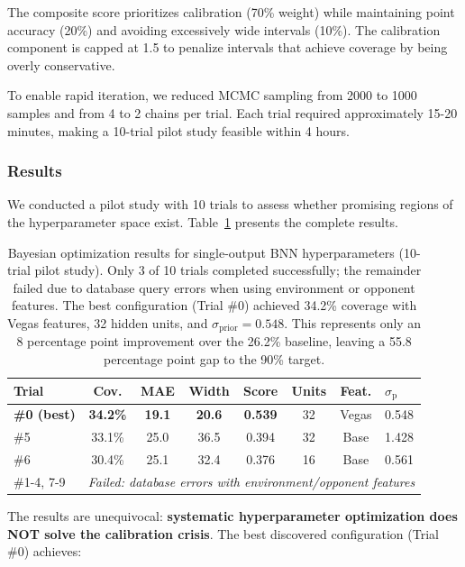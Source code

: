 The composite score prioritizes calibration (70\% weight) while maintaining point accuracy (20\%) and avoiding excessively wide intervals (10\%). The calibration component is capped at 1.5 to penalize intervals that achieve coverage by being overly conservative.

To enable rapid iteration, we reduced MCMC sampling from 2000 to 1000 samples and from 4 to 2 chains per trial. Each trial required approximately 15-20 minutes, making a 10-trial pilot study feasible within 4 hours.

\subsubsection{Results}

We conducted a pilot study with 10 trials to assess whether promising regions of the hyperparameter space exist. Table~\ref{tab:phase4_optimization_results} presents the complete results.

\begin{table}[t]
\centering
\small
\begin{tabular}{@{}lccccccl@{}}
\toprule
\textbf{Trial}  & \textbf{Cov.}  & \textbf{MAE}  & \textbf{Width}  & \textbf{Score}  & \textbf{Units}  & \textbf{Feat.}  & \textbf{$\sigma_{\text{p}}$} \\
\midrule
\textbf{\#0 (best)} & \textbf{34.2\%} & \textbf{19.1} & \textbf{20.6} & \textbf{0.539} & 32 & Vegas & 0.548 \\
\#5 & 33.1\% & 25.0 & 36.5 & 0.394 & 32 & Base & 1.428 \\
\#6 & 30.4\% & 25.1 & 32.4 & 0.376 & 16 & Base & 0.561 \\
\#1-4, 7-9 & \multicolumn{7}{c}{\textit{Failed: database errors with environment/opponent features}} \\
\bottomrule
\end{tabular}
\caption{Bayesian optimization results for single-output BNN hyperparameters (10-trial pilot study). Only 3 of 10 trials completed successfully; the remainder failed due to database query errors when using environment or opponent features. The best configuration (Trial \#0) achieved 34.2\% coverage with Vegas features, 32 hidden units, and $\sigma_{\text{prior}} = 0.548$. This represents only an 8 percentage point improvement over the 26.2\% baseline, leaving a 55.8 percentage point gap to the 90\% target.}
\label{tab:phase4_optimization_results}
\end{table}

The results are unequivocal: \textbf{systematic hyperparameter optimization does NOT solve the calibration crisis}. The best discovered configuration (Trial \#0) achieves:

